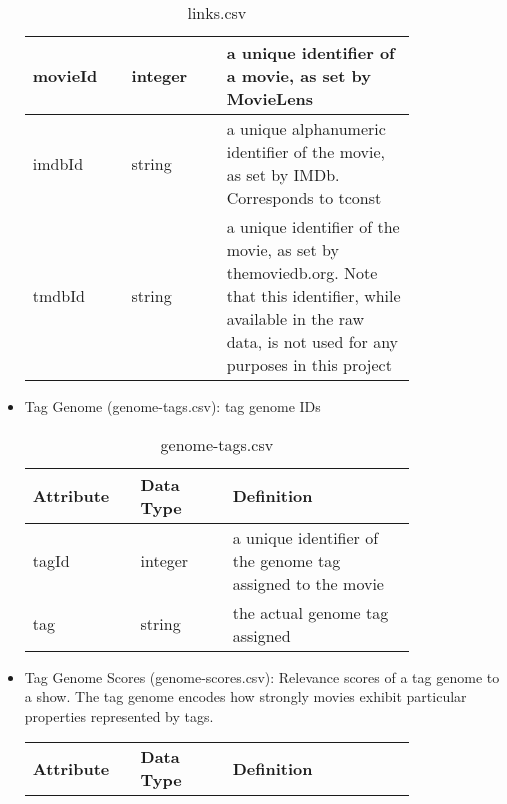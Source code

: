 \documentclass[10pt,titlepage]{article}
\begin{document}
\begin{itemize}
\begin{table}[H]
\begin{tabular}{p{0.2\linewidth} | p{0.2\linewidth} | p{0.4\linewidth}}
                \hline
                movieId & integer & a unique identifier of a movie, as set by MovieLens \\
                \hline
                imdbId & string & a unique alphanumeric identifier of the movie, as set by IMDb. Corresponds to tconst
                \\
                \hline
                tmdbId & string & a unique identifier of the movie, as set by themoviedb.org. Note that this identifier, while available
                in the raw data, is not used for any purposes in this project \\
                \hline


            \end{tabular}
            \caption{links.csv}
            \label{tab:ml_links}
        \end{table}

    \item Tag Genome (genome-tags.csv): tag genome IDs

        \begin{table}[H]
            \centering
            \begin{tabular}{p{0.2\linewidth} | p{0.2\linewidth} | p{0.4\linewidth}}
                \hline
                \textbf{Attribute} & \textbf{Data Type}  & \textbf{Definition}\\

                \hline
                tagId & integer & a unique identifier of the genome tag assigned to the movie \\
                \hline
                tag & string & the actual genome tag assigned \\
                \hline

            \end{tabular}
            \caption{genome-tags.csv}
            \label{tab:ml_genome_tags}
        \end{table}

    \item Tag Genome Scores (genome-scores.csv): Relevance scores of a tag genome to a show. The tag genome encodes how
        strongly movies exhibit particular properties represented by tags.

        \begin{table}[H]
            \centering
            \begin{tabular}{p{0.2\linewidth} | p{0.2\linewidth} | p{0.4\linewidth}}
                \hline
                \textbf{Attribute} & \textbf{Data Type}  & \textbf{Definition}\\


\end{tabular}
\end{table}
\end{itemize}
\end{document}
